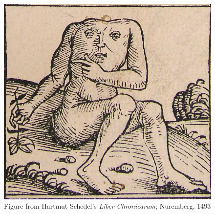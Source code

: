 \documentclass[output=paper
  ,nobabel
  ,draftmode
  ,colorlinks, citecolor=brown
]{langscibook}
\begin{document}
  
\begin{figure}
\includegraphics[width=\textwidth]{Figures/nuremberg-chronicles-strange-people-headless.jpg}
 
\caption{Figure from Hartmut Schedel's \emph{Liber Chronicarum}; Nuremberg, 1493}\label{fig-headless}
\end{figure}








{\sloppy
\printbibliography[heading=subbibliography,notkeyword=this]
}
\end{document}
